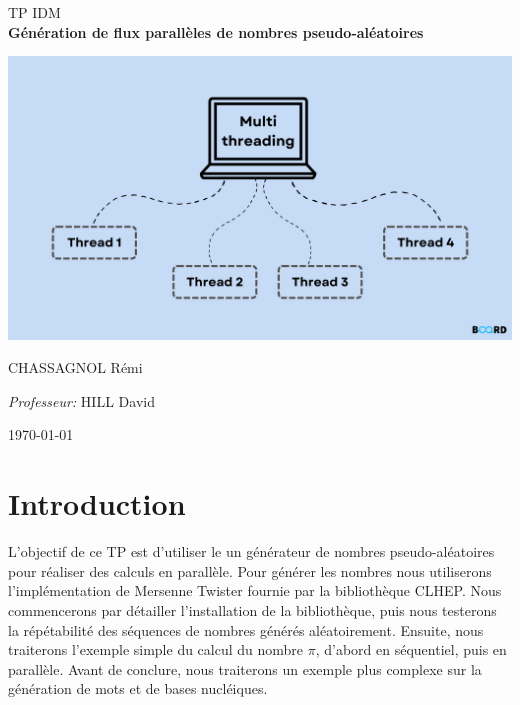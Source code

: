 \documentclass[a4paper]{article}
\begin{document}
\begin{titlepage}
\begin{center}

    \textsc{\LARGE TP IDM}\\[0.5cm]

    {\huge \bfseries Génération de flux parallèles de nombres pseudo-aléatoires\\[3cm]}

      \centering
      \includegraphics[scale=0.3]{./img/banner.png}

      \vspace*{\fill}

    \begin{multicols}{2}
      \large
      CHASSAGNOL Rémi\\

      \columnbreak

      \large
      \emph{Professeur:} HILL David\\
    \end{multicols}

    \textsc{\today}

  \end{center}
\end{titlepage}

\clearpage
\tableofcontents
\clearpage

\section{Introduction}

L'objectif de ce TP est d'utiliser le un générateur de nombres pseudo-aléatoires
pour réaliser des calculs en parallèle. Pour générer les nombres nous
utiliserons l'implémentation de Mersenne Twister fournie par la bibliothèque
CLHEP. Nous commencerons par détailler l'installation de la bibliothèque, puis
nous testerons la répétabilité des séquences de nombres générés aléatoirement.
Ensuite, nous traiterons l'exemple simple du calcul du nombre $\pi$, d'abord en
séquentiel, puis en parallèle. Avant de conclure, nous traiterons un exemple
plus complexe sur la génération de mots et de bases nucléiques.
\end{document}
